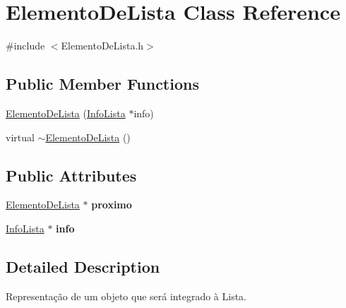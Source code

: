 \hypertarget{classElementoDeLista}{
\section{ElementoDeLista Class Reference}
\label{classElementoDeLista}
}


{\ttfamily \#include $<$ElementoDeLista.h$>$}

\subsection*{Public Member Functions}
\begin{DoxyCompactItemize}
\item 
\hyperlink{classElementoDeLista_a10afe26df806b11d803e95b7f686df3b}{ElementoDeLista} (\hyperlink{classInfoLista}{InfoLista} $\ast$info)
\item 
virtual \hyperlink{classElementoDeLista_aa45572dab10f62f3202e56b976db3b48}{$\sim$ElementoDeLista} ()
\end{DoxyCompactItemize}
\subsection*{Public Attributes}
\begin{DoxyCompactItemize}
\item 
\hypertarget{classElementoDeLista_a49173ee804f76c2fc2011058da0d7fa8}{
\hyperlink{classElementoDeLista}{ElementoDeLista} $\ast$ {\bfseries proximo}}
\label{classElementoDeLista_a49173ee804f76c2fc2011058da0d7fa8}

\item 
\hypertarget{classElementoDeLista_a107631746e37741d8c0ad70ade186fc3}{
\hyperlink{classInfoLista}{InfoLista} $\ast$ {\bfseries info}}
\label{classElementoDeLista_a107631746e37741d8c0ad70ade186fc3}

\end{DoxyCompactItemize}


\subsection{Detailed Description}
Representação de um objeto que será integrado à Lista. 

